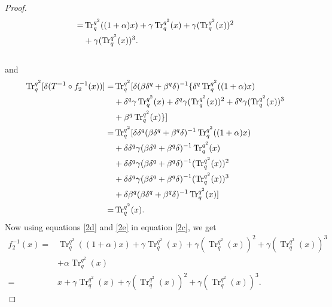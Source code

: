 \documentclass{birkjour}
\theoremstyle{definition}
\theoremstyle{remark}
\numberwithin{equation}{section}
\begin{document}
\begin{proof}
\begin{align}
		=&\operatorname{Tr}_{q}^{q^2}((1+\alpha)x)+\gamma\operatorname{Tr}_{q}^{q^2}(x)+\gamma(\operatorname{Tr}_{q}^{q^2}(x))^2\notag\\&+\gamma(\operatorname{Tr}_{q}^{q^2}(x))^3.\label{2d}
	\end{align}\\
	and
	\begin{align}
		\operatorname{Tr}_{q}^{q^2}[\delta (T^{-1}\circ f_2^{-1}(x))]=&\operatorname{Tr}_{q}^{q^2}[\delta (\beta\delta^{q}+\beta^{q}\delta)^{-1}\{\delta^{q}\operatorname{Tr}_{q}^{q^2}((1+\alpha)x)\notag\\&+\delta^{q}\gamma\operatorname{Tr}_{q}^{q^2}(x)+\delta^{q}\gamma(\operatorname{Tr}_{q}^{q^2}(x))^2+\delta^{q}\gamma(\operatorname{Tr}_{q}^{q^2}(x))^3\notag\\&+\beta^{q}\operatorname{Tr}_{q}^{q^2}(x)\}]\notag\\
		=&\operatorname{Tr}_{q}^{q^2}[\delta\delta^{q}(\beta\delta^{q}+\beta^{q}\delta)^{-1}\operatorname{Tr}_{q}^{q^2}((1+\alpha)x)\notag\\&+\delta\delta^{q}\gamma(\beta\delta^{q}+\beta^{q}\delta)^{-1}\operatorname{Tr}_{q}^{q^2}(x)\notag\\&+\delta\delta^{q}\gamma(\beta\delta^{q}+\beta^{q}\delta)^{-1}(\operatorname{Tr}_{q}^{q^2}(x))^2\notag\\&+\delta\delta^{q}\gamma(\beta\delta^{q}+\beta^{q}\delta)^{-1}(\operatorname{Tr}_{q}^{q^2}(x))^3\notag\\&+\delta\beta^{q}(\beta\delta^{q}+\beta^{q}\delta)^{-1}\operatorname{Tr}_{q}^{q^2}(x)]\notag\\
		=&\operatorname{Tr}_{q}^{q^2}(x).\label{2e}
	\end{align}
	 Now using equations \ref{2d} and \ref{2e} in equation \ref{2c}, we get
	\begin{align*}
		f_2^{-1}(x)=&\operatorname{Tr}_{q}^{q^2}((1+\alpha)x)+\gamma\operatorname{Tr}_{q}^{q^2}(x)+\gamma(\operatorname{Tr}_{q}^{q^2}(x))^2+\gamma(\operatorname{Tr}_{q}^{q^2}(x))^3\\&+\alpha\operatorname{Tr}_{q}^{q^2}(x)\\
		=&x+\gamma\operatorname{Tr}_{q}^{q^2}(x)+\gamma(\operatorname{Tr}_{q}^{q^2}(x))^2+\gamma(\operatorname{Tr}_{q}^{q^2}(x))^3.
	\end{align*}
\end{proof}
\end{document}
